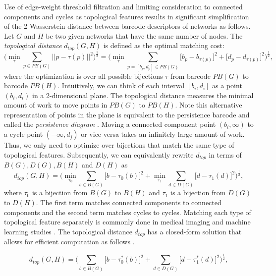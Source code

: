 \documentclass{article} %
\begin{document}
Use of edge-weight threshold filtration and limiting consideration to connected components and cycles as topological features results in significant simplification of the 2-Wasserstein distance \citep{rabin2011wasserstein} between barcode descriptors \citep{cohen2010lipschitz} of networks as follows. 
Let $G$ and $H$ be two given networks that have the same number of nodes.
The {\em topological distance} $d_{top}(G,H)$ is defined as the optimal matching cost:
\begin{equation}
 \Big( \min_{\tau} \sum_{p \in PB(G)} || p - \tau(p) ||^2 \Big)^{\frac{1}{2}} = \Big( \min_{\tau} \sum_{p = [b_p,d_p] \in PB(G)} \big[ b_p - b_{\tau(p)}\big]^2 + \big[ d_p - d_{\tau(p)}\big]^2 \Big)^{\frac{1}{2}} ,
\end{equation}
where the optimization is over all possible bijections $\tau$ from barcode $PB(G)$ to barcode $PB(H)$.
Intuitively, we can think of each interval $[b_i,d_i]$ as a point $(b_i,d_i)$ in a 2-dimensional plane. The topological distance measures the minimal amount of work to move points in $PB(G)$ to $PB(H)$. Note this alternative representation of points in the plane is equivalent to the persistence barcode and called the {\em persistence diagram} \citep{edelsbrunner2008persistent}. Moving a connected component point $(b_i,\infty)$ to a cycle point $(-\infty,d_j)$ or vice versa takes an infinitely large amount of work. Thus, we only need to optimize over bijections that match the same type of topological features. Subsequently, we can equivalently rewrite $d_{top}$ in terms of $B(G),D(G),B(H)$ and $D(H)$ as
\begin{equation}
 d_{top}(G,H) = \Big( \min_{\tau_0} \sum_{b \in B(G)} \big[ b - \tau_0(b)\big]^2 + \min_{\tau_1} \sum_{d \in D(G)} \big[ d - \tau_1(d)\big]^2 \Big)^{\frac{1}{2}} ,
\end{equation}
where $\tau_0$ is a bijection from $B(G)$ to $B(H)$ and $\tau_1$ is a bijection from $D(G)$ to $D(H)$.
The first term matches connected components to connected components and the second term matches cycles to cycles.
Matching each type of topological feature separately is commonly done in medical imaging and machine learning studies \citep{clough2020topological,hu2019topology}.
The topological distance $d_{top}$ has a closed-form solution that allows for efficient computation as follows \citep{songdechakraiwut2021topological}.

\begin{equation}
\label{prop:1dwass}
d_{top}(G,H) = \Big( \sum_{b \in B(G)} \big[ b - \tau_0^*(b)\big]^2 + \sum_{d \in D(G)} \big[ d - \tau_1^*(d)\big]^2 \Big)^\frac{1}{2},
\end{equation}
\end{document}
